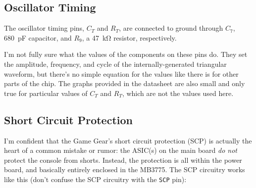 \documentclass{article}
\newcommand{\chippin}{\texttt}
\newcommand{\model}{\textsf}
\begin{document}
\subsection{Oscillator Timing}
The oscillator timing pins, $C_T$ and $R_T$, are connected to ground
through $C_7$, \qty{680}{\pico\farad} capacitor, and $R_9$, a
\qty{47}{\kilo\ohm} resistor, respectively.

I'm not fully sure what the values of the components on these pins
do. They set the amplitude, frequency, and cycle of the
internally-generated triangular waveform, but there's no simple
equation for the values like there is for other parts of the chip. The
graphs provided in the datasheet are also small and only true for
particular values of $C_T$ and $R_T$, which are not the values used
here.

\subsection{Short Circuit Protection}
\label{sec:scp}
I'm confident that the Game Gear's short circuit protection (SCP) is
actually the heart of a common mistake or rumor: the ASIC(s) on the
main board \emph{do not} protect the console from shorts. Instead, the
protection is all within the power board, and basically entirely
enclosed in the \model{MB3775}. The SCP circuitry works like this (don't
confuse the SCP circuitry with the \chippin{SCP} pin):
\end{document}
